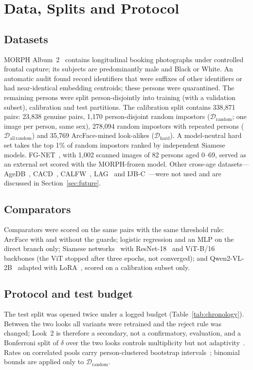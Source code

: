 \documentclass[journal]{IEEEtran}
\begin{document}
\section{Data, Splits and Protocol}
\label{sec:data}
\subsection{Datasets}
MORPH Album~2~\cite{ricanek2006morph} contains longitudinal booking photographs under controlled frontal capture; its subjects are predominantly male and Black or White. An automatic audit found record identifiers that were suffixes of other identifiers or had near-identical embedding centroids; these persons were quarantined. The remaining persons were split person-disjointly into training (with a validation subset), calibration and test partitions. The calibration split contains 338,871 pairs: 23,838 genuine pairs, 1,170 person-disjoint random impostors ($\mathcal{D}_\mathrm{random}$; one image per person, same sex), 278,094 random impostors with repeated persons ($\mathcal{D}_\mathrm{all\,random}$) and 35,769 ArcFace-mined look-alikes ($\mathcal{D}_\mathrm{hard}$). A model-neutral hard set takes the top 1\% of random impostors ranked by independent Siamese models. FG-NET~\cite{lanitis2002fgnet}, with 1,002 scanned images of 82 persons aged 0--69, served as an external set scored with the MORPH-frozen model. Other cross-age datasets---AgeDB~\cite{moschoglou2017agedb}, CACD~\cite{chen2014cacd}, CALFW~\cite{zheng2017calfw}, LAG~\cite{bianco2017lag} and IJB-C~\cite{maze2018ijbc}---were not used and are discussed in Section~\ref{sec:future}.

\subsection{Comparators}
Comparators were scored on the same pairs with the same threshold rule: ArcFace with and without the guards; logistic regression and an MLP on the direct branch only; Siamese networks~\cite{chopra2005siamese} with ResNet-18~\cite{he2016resnet} and ViT-B/16~\cite{dosovitskiy2021vit} backbones (the ViT stopped after three epochs, not converged); and Qwen2-VL-2B~\cite{wang2024qwen2vl} adapted with LoRA~\cite{hu2022lora}, scored on a calibration subset only.

\subsection{Protocol and test budget}
The test split was opened twice under a logged budget (Table~\ref{tab:chronology}). Between the two looks all variants were retrained and the reject rule was changed; Look~2 is therefore a secondary, not a confirmatory, evaluation, and a Bonferroni split of $\delta$ over the two looks controls multiplicity but not adaptivity~\cite{angelopoulos2021ltt}. Rates on correlated pools carry person-clustered bootstrap intervals~\cite{bolle2004subsets,efron1994bootstrap}; binomial bounds are applied only to $\mathcal{D}_\mathrm{random}$.
\end{document}
